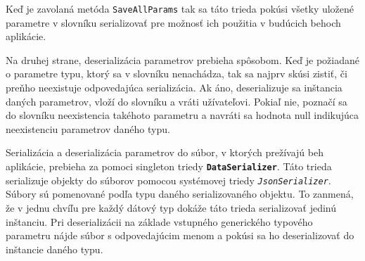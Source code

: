 Keď je zavolaná metóda \texttt{SaveAllParams} tak sa táto trieda pokúsi všetky uložené parametre v slovníku serializovať pre možnosť ich použitia v budúcich behoch aplikácie.

Na druhej strane, deserializácia parametrov prebieha  spôsobom. Keď je požiadané o parametre typu, ktorý sa v slovníku nenachádza, tak sa najprv skúsi zistiť, či preňho neexistuje odpovedajúca serializácia. Ak áno, deserializuje sa inštancia daných parametrov, vloží do slovníku a vráti užívateľovi. Pokiaľ nie, poznačí sa do slovníku neexistencia takéhoto parametru a navráti sa hodnota null indikujúca neexistenciu parametrov daného typu.  

Serializácia a deserializácia parametrov do súbor, v ktorých prežívajú beh aplikácie, prebieha za pomoci singleton triedy \textbf{\texttt{DataSerializer}}. Táto trieda serializuje objekty do súborov pomocou systémovej triedy \textit{\texttt{JsonSerializer}}. Súbory sú pomenované podľa typu daného serializovaného objektu. To zanmená, že v jednu chvíľu pre každý dátový typ dokáže táto trieda serializovať jedinú inštanciu. Pri deserializácii na základe vstupného generického typového parametru nájde súbor s odpovedajúcim menom a pokúsi sa ho deserializovať do inštancie daného typu.


  